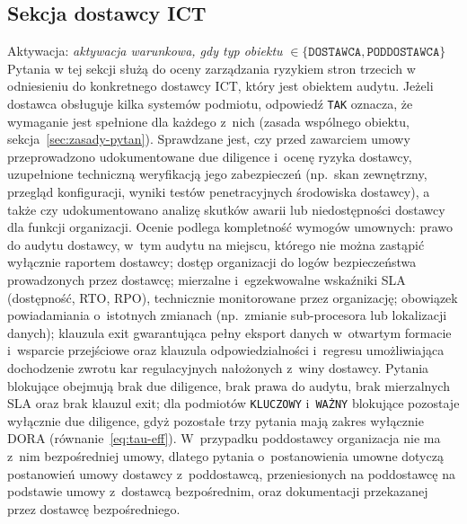 \subsection{Sekcja dostawcy ICT}
\noindent Aktywacja: \textit{aktywacja warunkowa, gdy typ obiektu} $\in \{\texttt{DOSTAWCA}, \texttt{PODDOSTAWCA}\}$\\
Pytania w tej sekcji służą do oceny zarządzania ryzykiem stron trzecich w odniesieniu do konkretnego dostawcy ICT, który jest obiektem audytu. Jeżeli dostawca obsługuje kilka systemów podmiotu, odpowiedź \texttt{TAK} oznacza, że wymaganie jest spełnione dla każdego z~nich (zasada wspólnego obiektu, sekcja~\ref{sec:zasady-pytan}). Sprawdzane jest, czy przed zawarciem umowy przeprowadzono udokumentowane due diligence i~ocenę ryzyka dostawcy, uzupełnione techniczną weryfikacją jego zabezpieczeń (np.\ skan zewnętrzny, przegląd konfiguracji, wyniki testów penetracyjnych środowiska dostawcy), a także czy udokumentowano analizę skutków awarii lub niedostępności dostawcy dla funkcji organizacji. Ocenie podlega kompletność wymogów umownych: prawo do audytu dostawcy, w~tym audytu na miejscu, którego nie można zastąpić wyłącznie raportem dostawcy; dostęp organizacji do logów bezpieczeństwa prowadzonych przez dostawcę; mierzalne i~egzekwowalne wskaźniki SLA (dostępność, RTO, RPO), technicznie monitorowane przez organizację; obowiązek powiadamiania o~istotnych zmianach (np.\ zmianie sub-procesora lub lokalizacji danych); klauzula exit gwarantująca pełny eksport danych w~otwartym formacie i~wsparcie przejściowe oraz klauzula odpowiedzialności i~regresu umożliwiająca dochodzenie zwrotu kar regulacyjnych nałożonych z~winy dostawcy. Pytania blokujące obejmują brak due diligence, brak prawa do audytu, brak mierzalnych SLA oraz brak klauzul exit; dla podmiotów \texttt{KLUCZOWY} i~\texttt{WAŻNY} blokujące pozostaje wyłącznie due diligence, gdyż pozostałe trzy pytania mają zakres wyłącznie DORA (równanie~\eqref{eq:tau-eff}). W~przypadku poddostawcy organizacja nie ma z~nim bezpośredniej umowy, dlatego pytania o~postanowienia umowne dotyczą postanowień umowy dostawcy z~poddostawcą, przeniesionych na poddostawcę na podstawie umowy z~dostawcą bezpośrednim, oraz dokumentacji przekazanej przez dostawcę bezpośredniego.

